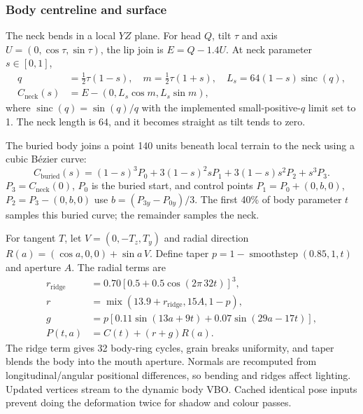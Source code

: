 \subsubsection{Body centreline and surface}
The neck bends in a local $YZ$ plane. For head $Q$, tilt $\tau$ and axis $U=(0,\cos\tau,\sin\tau)$, the lip join is $E=Q-1.4U$. At neck parameter $s\in[0,1]$,
\begin{align}
q&=\tfrac12\tau(1-s),\quad m=\tfrac12\tau(1+s),\quad L_s=64(1-s)\operatorname{sinc}(q),\\
C_{\mathrm{neck}}(s)&=E-(0,L_s\cos m,L_s\sin m),
\end{align}
where $\operatorname{sinc}(q)=\sin(q)/q$ with the implemented small-positive-$q$ limit set to 1. The neck length is 64, and it becomes straight as tilt tends to zero.

The buried body joins a point 140 units beneath local terrain to the neck using a cubic B\'ezier curve:
\begin{equation}
C_{\mathrm{buried}}(s)=(1-s)^3P_0+3(1-s)^2sP_1+3(1-s)s^2P_2+s^3P_3.
\end{equation}
$P_3=C_{\mathrm{neck}}(0)$, $P_0$ is the buried start, and control points $P_1=P_0+(0,b,0)$, $P_2=P_3-(0,b,0)$ use $b=(P_{3y}-P_{0y})/3$. The first 40\% of body parameter $t$ samples this buried curve; the remainder samples the neck.

For tangent $T$, let $V=(0,-T_z,T_y)$ and radial direction $R(a)=(\cos a,0,0)+\sin a\,V$. Define taper $p=1-\operatorname{smoothstep}(0.85,1,t)$ and aperture $A$. The radial terms are
\begin{align}
r_{\mathrm{ridge}}&=0.70[0.5+0.5\cos(2\pi\,32t)]^3,\\
r&=\operatorname{mix}(13.9+r_{\mathrm{ridge}},15A,1-p),\\
g&=p[0.11\sin(13a+9t)+0.07\sin(29a-17t)],\\
P(t,a)&=C(t)+(r+g)R(a).
\end{align}
The ridge term gives 32 body-ring cycles, grain breaks uniformity, and taper blends the body into the mouth aperture. Normals are recomputed from longitudinal/angular positional differences, so bending and ridges affect lighting. Updated vertices stream to the dynamic body VBO. Cached identical pose inputs prevent doing the deformation twice for shadow and colour passes.

